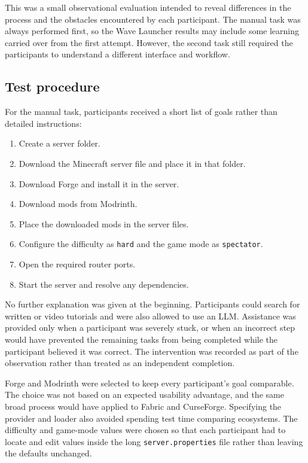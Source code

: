 This was a small observational evaluation intended to reveal differences in the process and the obstacles encountered by each participant. The manual task was always performed first, so the Wave Launcher results may include some learning carried over from the first attempt. However, the second task still required the participants to understand a different interface and workflow.

\subsection{Test procedure}

For the manual task, participants received a short list of goals rather than detailed instructions:

\begin{enumerate}
  \item Create a server folder.
  \item Download the Minecraft server file and place it in that folder.
  \item Download Forge and install it in the server.
  \item Download mods from Modrinth.
  \item Place the downloaded mods in the server files.
  \item Configure the difficulty as \texttt{hard} and the game mode as \texttt{spectator}.
  \item Open the required router ports.
  \item Start the server and resolve any dependencies.
\end{enumerate}

No further explanation was given at the beginning. Participants could search for written or video tutorials and were also allowed to use an LLM. Assistance was provided only when a participant was severely stuck, or when an incorrect step would have prevented the remaining tasks from being completed while the participant believed it was correct. The intervention was recorded as part of the observation rather than treated as an independent completion.

Forge and Modrinth were selected to keep every participant's goal comparable. The choice was not based on an expected usability advantage, and the same broad process would have applied to Fabric and CurseForge. Specifying the provider and loader also avoided spending test time comparing ecosystems. The difficulty and game-mode values were chosen so that each participant had to locate and edit values inside the long \texttt{server.properties} file rather than leaving the defaults unchanged.

